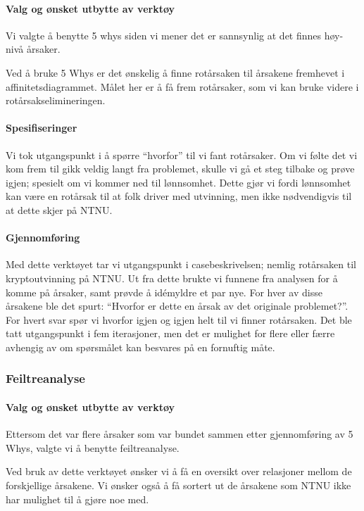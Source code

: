 \paragraph{Valg og ønsket utbytte av verktøy}
Vi valgte å benytte 5 whys siden vi mener det er sannsynlig at det finnes høy-nivå årsaker. 

Ved å bruke 5 Whys er det ønskelig å finne rotårsaken til årsakene fremhevet i affinitetsdiagrammet. Målet her er å få frem rotårsaker, som vi kan bruke videre i rotårsakselimineringen. 

\paragraph{Spesifiseringer}
Vi tok utgangspunkt i å spørre ``hvorfor'' til vi fant rotårsaker. Om vi følte det vi kom frem til gikk veldig langt fra problemet, skulle vi gå et steg tilbake og prøve igjen; spesielt om vi kommer ned til lønnsomhet. Dette gjør vi fordi lønnsomhet kan være en rotårsak til at folk driver med utvinning, men ikke nødvendigvis til at dette skjer på NTNU. 

\paragraph{Gjennomføring}
Med dette verktøyet tar vi utgangspunkt i casebeskrivelsen; nemlig rotårsaken til kryptoutvinning på NTNU. Ut fra dette brukte vi funnene fra analysen for å komme på årsaker, samt prøvde å idémyldre et par nye. For hver av disse årsakene ble det spurt: ``Hvorfor er dette en årsak av det originale problemet?''. For hvert svar spør vi hvorfor igjen og igjen helt til vi finner rotårsaken. Det ble tatt utgangspunkt i fem iterasjoner, men det er mulighet for flere eller færre avhengig av om spørsmålet kan besvares på en fornuftig måte. 

\subsubsection{Feiltreanalyse}
\paragraph{Valg og ønsket utbytte av verktøy}
Ettersom det var flere årsaker som var bundet sammen etter gjennomføring av 5 Whys, valgte vi å benytte feiltreanalyse.

Ved bruk av dette verktøyet ønsker vi å få en oversikt over relasjoner mellom de forskjellige årsakene. Vi ønsker også å få sortert ut de årsakene som NTNU ikke har mulighet til å gjøre noe med.

